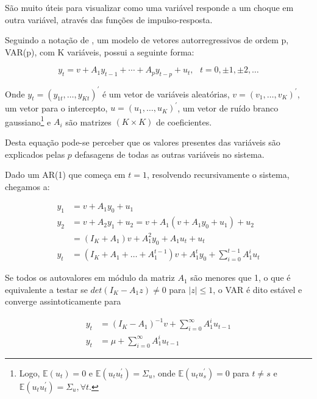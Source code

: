 \documentclass[a4paper,
               article,
               12pt,
               openany,
               oneside,
               english,
               brazil]{abntex2}
\numberwithin{equation}{section}
\begin{document}
    São muito úteis para visualizar como uma variável responde a um choque em outra variável, através das funções de impulso-resposta. 

    Seguindo a notação de \textcite[p.~13]{lutkepool}, um modelo de vetores autorregressivos de ordem p, VAR(p), com K variáveis, possui a seguinte forma:

    \begin{equation}
        \label{VAR}
        y_t = v + A_1 y_{t-1} + \cdots + A_p y_{t-p} + u_t,\text{\ \ } t = 0, \pm 1, \pm 2, \ldots
    \end{equation}

    Onde $ y_t = (y_{1t}, \ldots, y_{Kt})^{'} $ é um vetor de variáveis aleatórias, $ v  = (v_{1}, \ldots, v_{K})^{'}  $, um vetor para o intercepto, $ u = (u_{1}, \ldots, u_{K})^{'} $, um vetor de ruído branco gaussiano\footnote{Logo, $ \mathbb{E}(u_t) = 0 $ e $ \mathbb{E}(u_t u^{'}_t) = \Sigma_{u} $, onde $ \mathbb{E}(u_tu^{'}_s) = 0 $ para $ t \neq s $ e $ \mathbb{E}(u_t u^{'}_t) = \Sigma_u, \forall t $.} e $ A_i $ são matrizes $ (K \times K) $ de coeficientes.

    Desta equação pode-se perceber que os valores presentes das variáveis são explicados pelas $ p $ defasagens de todas as outras variáveis no sistema.

    Dado um AR(1) que começa em $ t = 1 $, resolvendo recursivamente o sistema, chegamos a:

    \begin{align}
        \label{VAR1}
        y_1 &= v + A_1 y_0 + u_1 \nonumber \\
        y_2 &= v + A_2 y_1 + u_2 = v + A_1(v + A_1y_0 + u_1) + u_2 \nonumber  \\
            &= (I_K + A_1)v + A^{2}_1 y_0 + A_1 u_t + u_t \nonumber \\
        y_t &= (I_K + A_1 + \dots + A^{t-1}_1)v + A^{t}_1 y_0 + \sum^{t-1}_{i=0} A^{i}_1 u_t
    \end{align}

    Se todos os autovalores em módulo da matriz $ A_1 $ são menores que 1, o que é equivalente a testar se $ det(I_{K} - A_1z) \neq 0 $ para $ \lvert z \rvert \leq 1 $, o VAR é dito estável e converge assintoticamente para

    \begin{equation}
        \label{ma}
        \begin{aligned}
        y_t &= (I_K - A_1)^{-1} v + \sum^{\infty}_{i=0} A^{i}_1 u_{t-1} \nonumber \\
        y_t &= \mu + \sum^{\infty}_{i=0} A^{i}_1 u_{t-1}
        \end{aligned}
    \end{equation}
\end{document}
